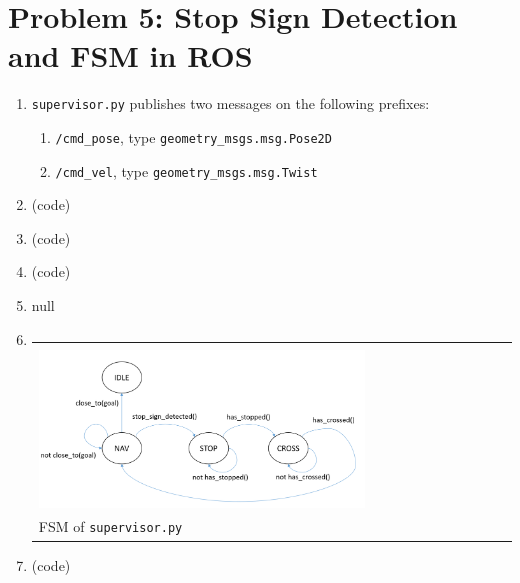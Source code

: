 \documentclass{article}
\begin{document}
\section*{Problem 5: Stop Sign Detection and FSM in ROS}
\begin{enumerate}[label=(\roman*)]
\item %
\texttt{supervisor.py} publishes two messages on the following prefixes:
\begin{enumerate}
	\item \texttt{/cmd\_pose}, type \texttt{geometry\_msgs.msg.Pose2D}
	\item \texttt{/cmd\_vel}, type \texttt{geometry\_msgs.msg.Twist}
\end{enumerate}

\item %
(code)

\item %
(code)

\item %
(code)

\item %
null

\item %
\begin{tabular}[t]{l}
	\hline \\
	\includegraphics[width=0.7\textwidth]{img/state_machine.png} \\
	\hline
	FSM of \texttt{supervisor.py} \\
\end{tabular}

\item %
(code)


\end{enumerate}
\end{document}
